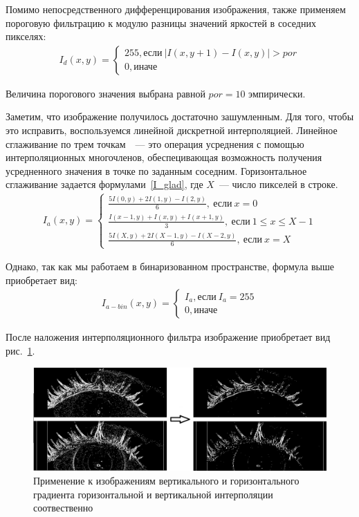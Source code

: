 \documentclass[12pt]{article} %
\begin{document}
Помимо непосредственного дифференцирования изображения, также применяем пороговую фильтрацию к модулю разницы значений яркостей в соседних пикселях:
\begin{gather}\label{I_diff}
	 I_d(x,y) = \begin{cases}
	 	255, \text{если}~|I(x,y+1) - I(x,y)|> por
	 	\\
	 	0, \text{иначе}
	 \end{cases}
\end{gather}

Величина порогового значения выбрана равной $por=10$ эмпирически.

Заметим, что изображение получилось достаточно зашумленным. Для того, чтобы это исправить, воспользуемся линейной дискретной интерполяцией. Линейное сглаживание по трем точкам~\cite{Inter}~--- это операция усреднения с помощью интерполяционных многочленов, обеспецивающая возможность получения усредненного значения в точке по заданным соседним. Горизонтальное сглаживание задается формулами~\ref{I_glad}, где $X$~--- число пикселей в строке.
\begin{gather}\label{I_glad}
	I_a(x,y) = \begin{cases}
		\frac{5I(0,y)+2I(1,y)-I(2,y)}{6},~\text{если}~x=0
		\\
		\frac{I(x-1,y)+I(x,y)+I(x+1,y)}{3},~\text{если}~1\leq x\leq X-1
		\\
			\frac{5I(X,y)+2I(X-1,y)-I(X-2,y)}{6},~\text{если}~x=X
	\end{cases}
\end{gather}

Однако, так как мы работаем в бинаризованном пространстве, формула выше приобретает вид:
\begin{gather}\label{I_glad_bin}
	I_{a-bin}(x,y) = \begin{cases}
		I_a, \text{если}~I_a = 255
		\\
		0, \text{иначе}
	\end{cases}
\end{gather}

После наложения интерполяционного фильтра изображение приобретает вид рис.~\ref{fig:I_glad}.

\begin{figure}[h]
	
	\centering
	
	\includegraphics[width=0.8\linewidth]{I_glad.jpg}
	
	\caption{Применение к изображениям вертикального и горизонтального градиента горизонтальной и вертикальной интерполяции соотвественно}
	
	\label{fig:I_glad}
	
\end{figure}
\end{document}
